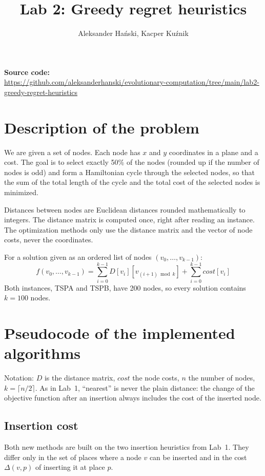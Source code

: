 \documentclass[11pt,a4paper]{article}
\title{Lab 2: Greedy regret heuristics}
\author{Aleksander Hański, Kacper Kuźnik}
\date{}
\begin{document}
\maketitle

\textbf{Source code:}\\
\url{https://github.com/aleksanderhanski/evolutionary-computation/tree/main/lab2-greedy-regret-heuristics}

\section{Description of the problem}

We are given a set of nodes. Each node has $x$ and $y$ coordinates in a plane and a cost. The goal
is to select exactly 50\% of the nodes (rounded up if the number of nodes is odd) and form a
Hamiltonian cycle through the selected nodes, so that the sum of the total length of the cycle and
the total cost of the selected nodes is minimized.

Distances between nodes are Euclidean distances rounded mathematically to integers. The distance
matrix is computed once, right after reading an instance. The optimization methods only use the
distance matrix and the vector of node costs, never the coordinates.

For a solution given as an ordered list of nodes $(v_0, \dots, v_{k-1})$:
\[
  f(v_0, \dots, v_{k-1}) = \sum_{i=0}^{k-1} D[v_i][v_{(i+1) \bmod k}] + \sum_{i=0}^{k-1} \mathit{cost}[v_i]
\]
Both instances, TSPA and TSPB, have 200 nodes, so every solution contains $k = 100$ nodes.

\section{Pseudocode of the implemented algorithms}

Notation: $D$ is the distance matrix, $\mathit{cost}$ the node costs, $n$ the number of nodes,
$k = \lceil n/2 \rceil$. As in Lab~1, ``nearest'' is never the plain distance: the change of the
objective function after an insertion always includes the cost of the inserted node.

\subsection*{Insertion cost}
Both new methods are built on the two insertion heuristics from Lab~1. They differ only in the set
of places where a node $v$ can be inserted and in the cost $\Delta(v, p)$ of inserting it at
place $p$.
\end{document}
